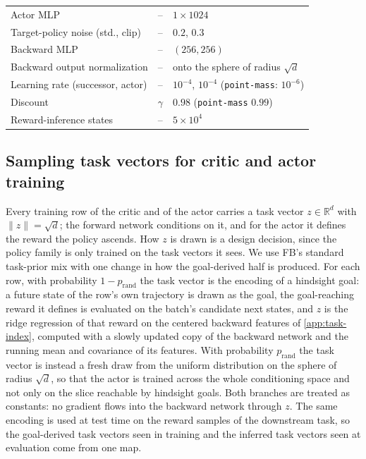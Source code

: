 \begin{table}[t]
\begin{tabular}{@{}lll@{}}
Actor MLP                       & --       & $1\times1024$ \\
Target-policy noise (std., clip) & --      & $0.2$, $0.3$ \\
Backward MLP                    & --       & $(256,256)$ \\
Backward output normalization   & --       & onto the sphere of radius $\sqrt d$ \\
Learning rate (successor, actor) & --      & $10^{-4}$, $10^{-4}$ (\texttt{point-mass}: $10^{-6}$) \\
Discount                        & $\gamma$ & $0.98$ (\texttt{point-mass} $0.99$) \\
Reward-inference states         & --       & $5\times10^{4}$ \\
\bottomrule
\end{tabular}
\end{table}

\subsection{Sampling task vectors for critic and actor training}
\label{app:z-sampling}

Every training row of the critic and of the actor carries a task vector $z\in\mathbb R^d$ with $\|z\|=\sqrt d$; the forward network conditions on it, and for the actor it defines the reward the policy ascends.
How $z$ is drawn is a design decision, since the policy family is only trained on the task vectors it sees.
We use FB's standard task-prior mix with one change in how the goal-derived half is produced.
For each row, with probability $1-p_{\mathrm{rand}}$ the task vector is the encoding of a hindsight goal: a future state of the row's own trajectory is drawn as the goal, the goal-reaching reward it defines is evaluated on the batch's candidate next states, and $z$ is the ridge regression of that reward on the centered backward features of \cref{app:task-index}, computed with a slowly updated copy of the backward network and the running mean and covariance of its features.
With probability $p_{\mathrm{rand}}$ the task vector is instead a fresh draw from the uniform distribution on the sphere of radius $\sqrt d$, so that the actor is trained across the whole conditioning space and not only on the slice reachable by hindsight goals.
Both branches are treated as constants: no gradient flows into the backward network through $z$.
The same encoding is used at test time on the reward samples of the downstream task, so the goal-derived task vectors seen in training and the inferred task vectors seen at evaluation come from one map.

